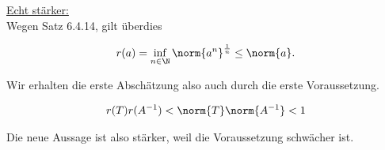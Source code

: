 \begin{solution}
\underline{Echt stärker:} \\

Wegen Satz 6.4.14, gilt überdies

\begin{align*}
  r(a)
  =
  \inf_{n \in \N}
  \norm{a^n}^\frac{1}{n}
  \leq
  \norm{a}.
\end{align*}

Wir erhalten die erste Abschätzung also auch durch die erste Voraussetzung.

\begin{align*}
  r(T) r(A^{-1})
  <
  \norm{T} \norm{A^{-1}} < 1
\end{align*}

Die neue Aussage ist also stärker, weil die Voraussetzung schwächer ist.

\end{solution}
